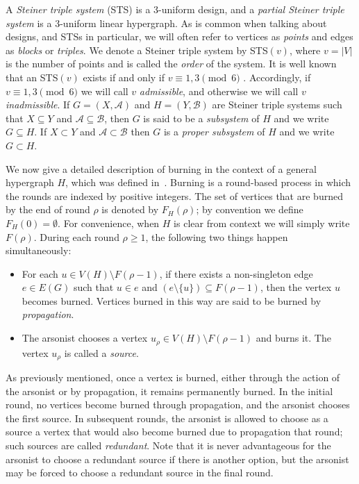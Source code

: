\documentclass[12pt]{article}
\theoremstyle{definition}
\numberwithin{table}{section}
\newcommand{\round}{{\rho}}
\begin{document}
A {\em Steiner triple system} (STS) is a 3-uniform design, and a \emph{partial Steiner triple system} is a 3-uniform linear hypergraph. As is common when talking about designs, and STSs in particular, we will often refer to vertices as {\em points} and edges as {\em blocks} or {\em triples}. 
We denote a Steiner triple system by STS$(v)$, where $v=|V|$ is the number of points and is called the {\em order} of the system.
It is well known that an STS$(v)$ exists if and only if $v\equiv 1,3 \pmod 6$ \cite{kirkman_1847}. Accordingly, if $v\equiv 1,3 \pmod 6$ we will call $v$ \emph{admissible}, and otherwise we will call $v$ \emph{inadmissible}. 
If $G=(X,\mathcal{A})$ and $H=(Y,\mathcal{B})$ are Steiner triple systems 
such that $X \subseteq Y$ and $\mathcal{A} \subseteq \mathcal{B}$, then $G$ is said to be a \emph{subsystem} of $H$ and we write $G \subseteq H$. If $X \subset Y$ and $\mathcal{A} \subset \mathcal{B}$ then $G$ is a \emph{proper subsystem} of $H$ and we write $G \subset H$.

We now give a detailed description of burning in the context of a general hypergraph $H$, which was defined in~\cite{introducing_hyp_burn,mythesis}.
Burning is a round-based process in which the rounds are indexed by positive integers. The set of vertices that are burned by the end of round $\round$ is denoted by $F_H(\round)$; by convention we define $F_H(0)=\emptyset$. For convenience, when $H$ is clear from context we will simply write $F(\round)$.
During each round $\round \geq 1$, the following two things happen simultaneously:

\begin{itemize}
\item 
For each $u \in V(H) \setminus F({\round-1})$, if there exists a non-singleton edge $e \in E(G)$ such that $u \in e$ and $(e \setminus \{u\}) \subseteq F(\round-1)$, then the vertex $u$ becomes burned. Vertices burned in this way are said to be burned by {\em propagation}.
\item The arsonist chooses a vertex $u_\round \in V(H)\setminus F(\round-1)$ and burns it.  The vertex $u_\round$ is called a {\em source}.
\end{itemize}

As previously mentioned, once a vertex is burned, either through the action of the arsonist or by propagation, it remains permanently burned. In the initial round, no vertices become burned through propagation, and the arsonist chooses the first source. 
In subsequent rounds, the arsonist is allowed to choose as a source a vertex that would also become burned due to propagation that round; such sources are called {\em redundant}. Note that it is never advantageous for the arsonist to choose a redundant source if there is another option, but the arsonist may be forced to choose a redundant source in the final round. 
\end{document}
